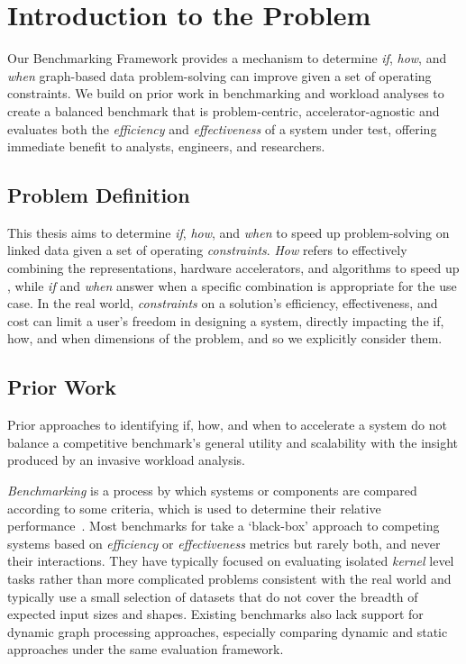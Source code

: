 \section{Introduction to the Problem}
\label{section:11-introduction-to-problem}
Our \gai Benchmarking Framework provides a mechanism to determine \textit{if}, \textit{how}, and \textit{when} graph-based data problem-solving can improve given a set of operating constraints.
We build on prior work in benchmarking and workload analyses to create a balanced benchmark that is problem-centric, accelerator-agnostic and evaluates both the \textit{efficiency} and \textit{effectiveness} of a system under test, offering immediate benefit to analysts, engineers, and researchers. 

\subsection{Problem Definition}
This thesis aims to determine \textit{if}, \textit{how}, and \textit{when} to speed up problem-solving on linked data given a set of operating \textit{constraints}.
\textit{How} refers to effectively combining the representations, hardware accelerators, and algorithms to speed up \gai, while \textit{if} and \textit{when} answer when a specific combination is appropriate for the use case. 
In the real world, \textit{constraints} on a solution's efficiency, effectiveness, and cost can limit a user's freedom in designing a system, directly impacting the if, how, and when dimensions of the problem, and so we explicitly consider them.

\subsection{Prior Work}
Prior approaches to identifying if, how, and when to accelerate a \gai system do not balance a competitive benchmark's general utility and scalability with the insight produced by an invasive workload analysis. 

\textit{Benchmarking} is a process by which systems or components are compared according to some criteria, which is used to determine their relative performance~\cite{Kistowski2015}.
Most benchmarks for \gai take a `black-box' approach to competing systems based on \textit{efficiency} or \textit{effectiveness} metrics but rarely both, and never their interactions.
They have typically focused on evaluating isolated \textit{kernel} level tasks rather than more complicated problems consistent with the real world and typically use a small selection of datasets that do not cover the breadth of expected input sizes and shapes.
Existing benchmarks also lack support for dynamic graph processing approaches, especially comparing dynamic and static approaches under the same evaluation framework.

